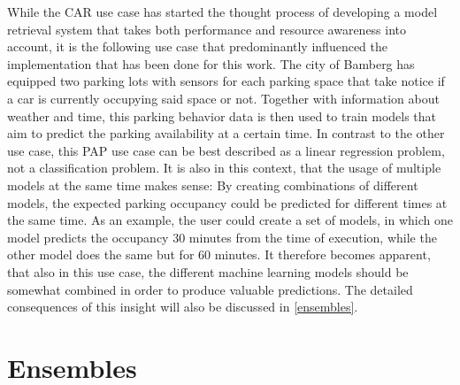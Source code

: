 While the CAR use case has started the thought process of developing a model retrieval system that takes both performance and resource awareness into account, it is the following use case that predominantly influenced the implementation that has been done for this work. The city of Bamberg has equipped two parking lots with sensors for each parking space that take notice if a car is currently occupying said space or not. Together with information about weather and time, this parking behavior data is then used to train models that aim to predict the parking availability at a certain time. In contrast to the other use case, this PAP use case can be best described as a linear regression problem, not a classification problem. It is also in this context, that the usage of multiple models at the same time makes sense: By creating combinations of different models, the expected parking occupancy could be predicted for different times at the same time. As an example, the user could create a set of models, in which one model predicts the occupancy 30 minutes from the time of execution, while the other model does the same but for 60 minutes. It therefore becomes apparent, that also in this use case, the different machine learning models should be somewhat combined in order to produce valuable predictions. The detailed consequences of this insight will also be discussed in \autoref{ensembles}.




\section{Ensembles} \label{ensembles}

